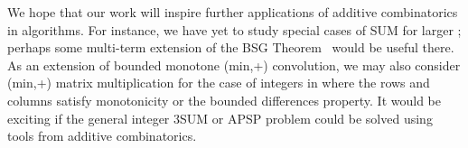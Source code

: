 \documentclass[11pt]{article}
\begin{document}
{We hope that our work will inspire further applications of additive combinatorics in algorithms.
For instance, we have yet to study special cases of SUM for
larger ;
perhaps some multi-term extension of the BSG Theorem~\cite{BC} would be
useful there.  As an extension of bounded monotone (min,+)
convolution, we may also consider (min,+) matrix
multiplication for the case of integers in  where the
rows and columns satisfy monotonicity or the bounded differences
property.
It would be exciting if the general integer 3SUM or APSP
problem could be solved using tools from
additive combinatorics.

}


\end{document}
